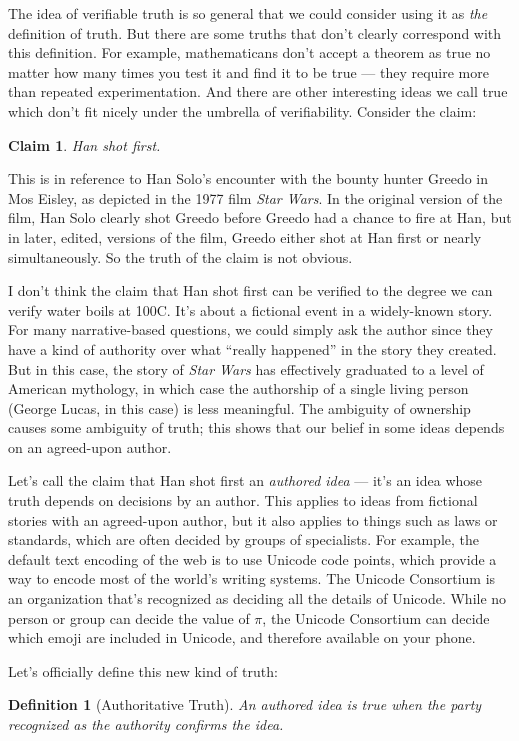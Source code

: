 \documentclass[9pt, twoside]{book}
\newtheorem*{defn}{Definition}
\newtheorem*{claim}{Claim}
\theoremstyle{argtstyle}
\begin{document}
The idea of verifiable truth is so general that we could consider using it as
{\em the} definition of truth.
But there are some truths that don't clearly correspond with this definition.
For example, mathematicans don't accept a theorem as true no
matter how many times you test it and find it to be true --- they require
more than repeated experimentation.
And there are other interesting ideas we call true
which don't fit nicely under the umbrella of verifiability.
Consider the claim:
\begin{claim}\label{c2}
    Han shot first.
\end{claim}
This is in reference to Han Solo's encounter with the bounty hunter Greedo in
Mos Eisley, as depicted in the 1977 film {\em Star Wars}.
In the original version of the film, Han Solo clearly shot Greedo before Greedo
had a chance to
fire at Han, but in later, edited, versions of the film, Greedo either shot at
Han first or nearly simultaneously. So the truth of the claim is not
obvious.

I don't think the claim that Han shot first
can be verified to the degree we can verify
water boils at 100\degree C.
It's about a fictional event in a widely-known story.
For many narrative-based questions, we could simply ask the author since they
have a kind of authority over what ``really happened'' in the story they
created. But in this case, the story of {\em Star Wars} has effectively
graduated to a level of American mythology, in which case the authorship of a
single living person (George Lucas, in this case) is less meaningful.
The ambiguity of ownership causes some ambiguity of truth;
this shows that our belief in some ideas depends on an agreed-upon author.

Let's call the claim that Han shot first
an {\em authored idea} --- it's an idea whose
truth depends on decisions by an author.
This applies to ideas from fictional stories with an agreed-upon
author, but it also applies to things such as laws or standards, which are often
decided by groups of specialists. For example, the default text encoding of the
web is to use Unicode code points, which provide a way to encode most of the
world's writing systems. The Unicode Consortium is an organization that's
recognized as deciding all the details of Unicode.
While no person or group can decide the value of $\pi$, the Unicode Consortium
can decide which emoji are included in Unicode, and therefore available on your
phone.

Let's officially define this new kind of truth:
\begin{defn}[Authoritative Truth]
    An authored idea is true when the party recognized as the authority confirms
    the idea.
\end{defn}
\end{document}
